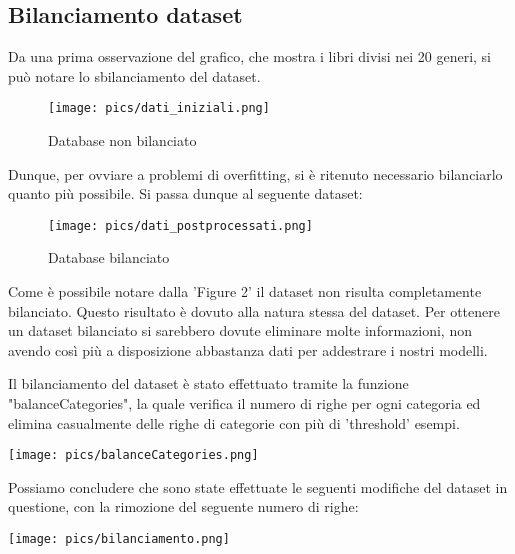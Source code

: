 \documentclass[12pt,oneside]{article}
\begin{document}
    \begin{enumerate}
    \subsection{Bilanciamento dataset}
    \begin{justify}
    Da una prima osservazione del grafico, che mostra i libri divisi nei 20 generi, si può notare lo sbilanciamento del dataset. 
    \end{justify}
    
    \begin{figure}[H]
    \texttt{[image: pics/dati\_iniziali.png]}
    \caption{Database non bilanciato}
    \end{figure}
    
    \begin{justify}
    Dunque, per ovviare a problemi di overfitting, si è ritenuto necessario bilanciarlo quanto più possibile. Si passa dunque al seguente dataset:
    \end{justify}
    
    \begin{figure}[H]
    \texttt{[image: pics/dati\_postprocessati.png]}
    \caption{Database bilanciato}
    \end{figure}
    
    \begin{justify}
    Come è possibile notare dalla 'Figure 2' il dataset non risulta completamente bilanciato. Questo risultato è dovuto alla natura stessa del dataset. Per ottenere un dataset bilanciato si sarebbero dovute eliminare molte informazioni, non avendo così più a disposizione abbastanza dati per addestrare i nostri modelli.\\
    \end{justify}
    \hfill
    \begin{justify}
    Il bilanciamento del dataset è stato effettuato tramite la funzione "balanceCategories", la quale verifica il numero di righe per ogni categoria ed elimina casualmente delle righe di categorie con più di 'threshold' esempi.
    \end{justify}
    \texttt{[image: pics/balanceCategories.png]}
    

    \begin{minipage}[t]{0.40\textwidth}
    \vspace{30pt}
    Possiamo concludere che sono state effettuate le seguenti modifiche del dataset in questione, con la rimozione del seguente numero di righe:
    \end{minipage}
    \hfill
    \begin{minipage}[t]{0.50\textwidth}
    \vspace{20pt}
    \texttt{[image: pics/bilanciamento.png]}
    \end{minipage}
    \end{enumerate}
\end{document}

